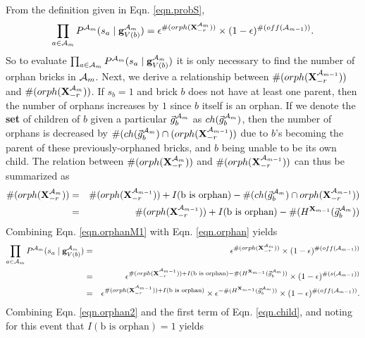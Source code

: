 \documentclass[11pt]{article}
\newcommand{\A}{{\cal A}}
\newcommand{\X}{\mathbf{X}}
\newcommand{\Xrm}{\X^{\Am}_{-r}}
\newcommand{\XrmPrev}{\X^{\A_{m-1}}_{-r}}
\newcommand{\Am}{\A_{m}}
\begin{document}
From the definition given in Eqn. \ref{eqn.probS}, 
%
\begin{eqnarray}
\prod_{a \in {\Am}} P^{\Am}(s_a \mid \mathbf{g}^{\Am}_{V({b})}) = \epsilon^{\#(orph(\Xrm))} \times (1-\epsilon)^{\#(off(\A_{m-1}))}. \label{eqn.orphan}
\end{eqnarray}
%
So to evaluate $\prod_{a \in {\Am}} P^{\Am}(s_a \mid \mathbf{g}^{\Am}_{V({b})})$ it is only necessary to find the number of orphan bricks in $\Am$.
%
Next, we derive a relationship between $\#(orph(\XrmPrev))$ and $\#(orph(\Xrm))$. If $s_b=1$ and brick $b$ does not have at least one parent, then the number of orphans increases by $1$ since $b$ itself is an orphan. If we denote the \textbf{set} of children of $b$ given a particular $\vec{g}_b^{\Am}$ as $ch(\vec{g}_b^{\Am})$, then the number of orphans is decreased by $\#(ch(\vec{g}_b^{\Am}) \cap (orph(\XrmPrev))$ due to $b$'s becoming the parent of these previously-orphaned bricks, and $b$ being unable to be its own child. The relation between $\#(orph(\Xrm))$ and $\#(orph(\XrmPrev))$ can thus be summarized as
%
\begin{eqnarray}
\#(orph(\Xrm)) &=& \#(orph(\XrmPrev)) + I(\text{b is orphan}) - \#(ch(\vec{g}_b^{\Am}) \cap orph(\XrmPrev)) \\
%
&=& \#(orph(\XrmPrev)) + I(\text{b is orphan}) - \#(H^{\X_{m-1}}(\vec{g}_b^{\Am})) \label{eqn.orphanM1}
\end{eqnarray}
%
Combining Eqn. \ref{eqn.orphanM1} with Eqn. \ref{eqn.orphan} yields
%
\begin{eqnarray}
\prod_{a \in {\Am}} P^{\Am}(s_a \mid \mathbf{g}^{\Am}_{V({b})}) &=& \epsilon^{\#(orph(\Xrm))} \times (1-\epsilon)^{\#(off(\A_{m-1}))} \\
%
&=&\epsilon^{\#(orph(\XrmPrev)) + I(\text{b is orphan}) - \#(H^{\X_{m-1}}(\vec{g}_b^{\Am}))} \times (1-\epsilon)^{\#(s(\A_{m-1}))} \\
%
&=& \epsilon^{\#(orph(\XrmPrev)) + I(\text{b is orphan})} \times \epsilon^{- \#(H^{\X_{m-1}}(\vec{g}_b^{\Am}))} \times (1-\epsilon)^{\#(off(\A_{m-1}))} \label{eqn.orphan2}.
\end{eqnarray}
%
Combining Eqn. \ref{eqn.orphan2} and the first term of Eqn. \ref{eqn.child}, and noting for this event that $ I(\text{b is orphan})=1$ yields
\end{document}
